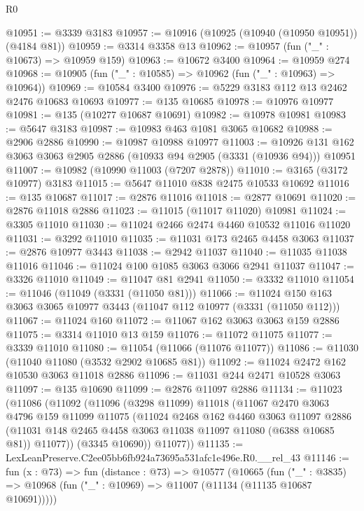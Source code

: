 \begin{lexlean}{R0}
\begin{coremodule}
@10951 := @3339 @3183
@10957 := @10916 (@10925 (@10940 (@10950 @10951)) (@4184 @81))
@10959 := @3314 @3358 @13
@10962 := @10957 (fun ("_" : @10673) => @10959 @159)
@10963 := @10672 @3400
@10964 := @10959 @274
@10968 := @10905 (fun ("_" : @10585) => @10962 (fun ("_" : @10963) => @10964))
@10969 := @10584 @3400
@10976 := @5229 @3183 @112 @13 @2462 @2476 @10683 @10693
@10977 := @135 @10685
@10978 := @10976 @10977
@10981 := @135 (@10277 @10687 @10691)
@10982 := @10978 @10981
@10983 := @5647 @3183
@10987 := @10983 @463 @1081 @3065 @10682
@10988 := @2906 @2886
@10990 := @10987 @10988 @10977
@11003 := @10926 @131 @162 @3063 @3063 @2905 @2886 (@10933 @94 @2905 (@3331 (@10936 @94))) @10951
@11007 := @10982 (@10990 @11003 (@7207 @2878))
@11010 := @3165 (@3172 @10977) @3183
@11015 := @5647 @11010 @838 @2475 @10533 @10692
@11016 := @135 @10687
@11017 := @2876 @11016
@11018 := @2877 @10691
@11020 := @2876 @11018 @2886
@11023 := @11015 (@11017 @11020) @10981
@11024 := @3305 @11010
@11030 := @11024 @2466 @2474 @4460 @10532 @11016 @11020
@11031 := @3292 @11010
@11035 := @11031 @173 @2465 @4458 @3063
@11037 := @2876 @10977 @3443
@11038 := @2942 @11037
@11040 := @11035 @11038 @11016
@11046 := @11024 @100 @1085 @3063 @3066 @2941 @11037
@11047 := @3326 @11010
@11049 := @11047 @81 @2941
@11050 := @3332 @11010
@11054 := @11046 (@11049 (@3331 (@11050 @81)))
@11066 := @11024 @150 @163 @3063 @3065 @10977 @3443 (@11047 @112 @10977 (@3331 (@11050 @112)))
@11067 := @11024 @160
@11072 := @11067 @162 @3063 @3063 @159 @2886
@11075 := @3314 @11010 @13 @159
@11076 := @11072 @11075
@11077 := @3339 @11010
@11080 := @11054 (@11066 (@11076 @11077))
@11086 := @11030 (@11040 @11080 (@3532 @2902 @10685 @81))
@11092 := @11024 @2472 @162 @10530 @3063 @11018 @2886
@11096 := @11031 @244 @2471 @10528 @3063
@11097 := @135 @10690
@11099 := @2876 @11097 @2886
@11134 := @11023
    (@11086
      (@11092
        (@11096
          (@3298 @11099)
          @11018
          (@11067
            @2470
            @3063
            @4796
            @159
            @11099
            @11075
            (@11024
              @2468
              @162
              @4460
              @3063
              @11097
              @2886
              (@11031 @148 @2465 @4458 @3063 @11038 @11097 @11080 (@6388 @10685 @81))
              @11077))
          (@3345 @10690))
        @11077))
@11135 := LexLeanPreserve.C2ee05bb6fb924a73695a531afc1e496e.R0.__rel_43
@11146 := fun (x : @73) =>
  fun (distance : @73) =>
  @10577
    (@10665
      (fun ("_" : @3835) => @10968 (fun ("_" : @10969) => @11007 (@11134 (@11135 @10687 @10691)))))

\end{coremodule}
\end{lexlean}
